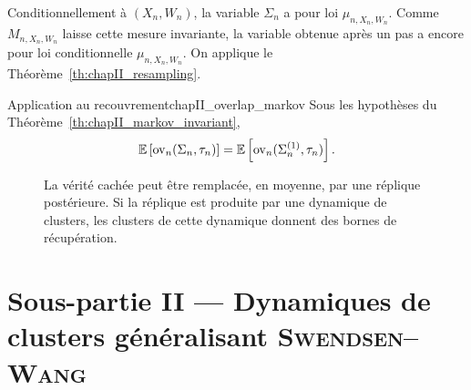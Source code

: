 \begin{Preuve}
Conditionnellement à $(X_n,W_n)$, la variable $\Sigma_n$ a pour loi $\mu_{n,X_n,W_n}$. Comme $M_{n,X_n,W_n}$ laisse cette mesure invariante, la variable obtenue après un pas a encore pour loi conditionnelle $\mu_{n,X_n,W_n}$. On applique le Théorème~\ref{th:chapII_resampling}.
\end{Preuve}

\begin{Corollaire}{Application au recouvrement}{chapII_overlap_markov}
Sous les hypothèses du Théorème~\ref{th:chapII_markov_invariant},
\begin{equation}
    \mathbb E\left[\operatorname{ov}_n(\Sigma_n,\tau_n)\right]
    =
    \mathbb E\left[\operatorname{ov}_n(\Sigma_n^{(1)},\tau_n)\right].
    \label{eq:chapII_overlap_markov}
\end{equation}
\end{Corollaire}

\begin{figure}[H]
\centering
{}
\caption{La vérité cachée peut être remplacée, en moyenne, par une réplique postérieure. Si la réplique est produite par une dynamique de clusters, les clusters de cette dynamique donnent des bornes de récupération.}
\label{fig:chapII_resampling}
\end{figure}

\section*{Sous-partie II --- Dynamiques de clusters généralisant \textsc{Swendsen--Wang}}
\label{sec:chapII_partie_dynamique}

